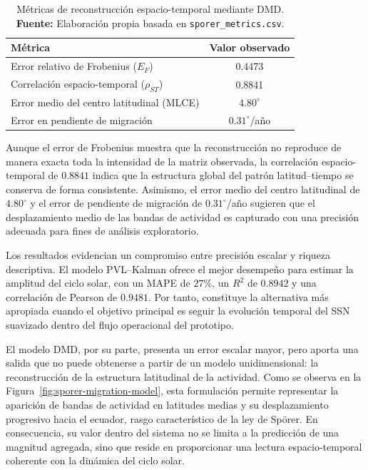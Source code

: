 \begin{table}[H]
\centering
\caption{Métricas de reconstrucción espacio-temporal mediante DMD. \textbf{Fuente:} Elaboración propia basada en \texttt{sporer\_metrics.csv}.}
\label{tab:sporer-performance}
\begin{tabular}{lc}
\hline
\textbf{Métrica} & \textbf{Valor observado} \\ \hline
Error relativo de Frobenius ($E_F$) & 0.4473 \\
Correlación espacio-temporal ($\rho_{ST}$) & 0.8841 \\
Error medio del centro latitudinal (MLCE) & $4.80^{\circ}$ \\
Error en pendiente de migración & $0.31^{\circ}$/año \\ \hline
\end{tabular}
\end{table}


Aunque el error de Frobenius muestra que la reconstrucción no reproduce de manera exacta toda la intensidad de la matriz observada, la correlación espacio-temporal de $0.8841$ indica que la estructura global del patrón latitud--tiempo se conserva de forma consistente. Asimismo, el error medio del centro latitudinal de $4.80^{\circ}$ y el error de pendiente de migración de $0.31^{\circ}$/año sugieren que el desplazamiento medio de las bandas de actividad es capturado con una precisión adecuada para fines de análisis exploratorio.


Los resultados evidencian un compromiso entre precisión escalar y riqueza descriptiva. El modelo PVL--Kalman ofrece el mejor desempeño para estimar la amplitud del ciclo solar, con un MAPE de $27\%$, un $R^2$ de $0.8942$ y una correlación de Pearson de $0.9481$. Por tanto, constituye la alternativa más apropiada cuando el objetivo principal es seguir la evolución temporal del SSN suavizado dentro del flujo operacional del prototipo.

El modelo DMD, por su parte, presenta un error escalar mayor, pero aporta una salida que no puede obtenerse a partir de un modelo unidimensional: la reconstrucción de la estructura latitudinal de la actividad. Como se observa en la Figura~\ref{fig:sporer-migration-model}, esta formulación permite representar la aparición de bandas de actividad en latitudes medias y su desplazamiento progresivo hacia el ecuador, rasgo característico de la ley de Spörer. En consecuencia, su valor dentro del sistema no se limita a la predicción de una magnitud agregada, sino que reside en proporcionar una lectura espacio-temporal coherente con la dinámica del ciclo solar.

